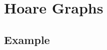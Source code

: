 \section{Hoare Graphs}

\subsection{Example}

\begin{comment}
\begin{frame}[fragile]{Assembly Snippet}
  \begin{block}{32-bit \gls{x86} for display purposes}
    \begin{lstlisting}[style=x64,gobble=6]
      0x0 : 3dc3000000    cmp  eax,c3 |\label{hg-example-cmp}|
      0x5 : 0f8718000000  ja   1c     |\label{hg-example-ja}|
      0xb : 8b0485__a___  mov  eax,DWORD PTR [eax*4+a] |\label{hg-example-jump-table-read}|
      0x12: 8907          mov  DWORD PTR [edi],eax |\label{hg-example-mov1}|
      0x14: c70601000000  mov  DWORD PTR [esi],1   |\label{hg-example-mov2}|
      0x1a: ff27          jmp  DWORD PTR [edi]     |\label{hg-example-indirect-jump}|
    \end{lstlisting}
  \end{block}
\end{frame}
\end{comment}

